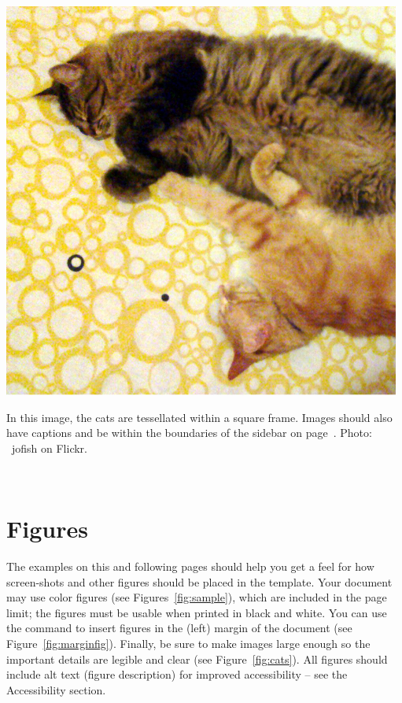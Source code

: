 \documentclass{sigchi-ext}
\begin{document}

\begin{marginfigure}[-35pc]
  \begin{minipage}{\marginparwidth}
    \centering
    \includegraphics[width=0.9\marginparwidth]{figures/cats}
    \caption{In this image, the cats are tessellated within a square
      frame. Images should also have captions and be within the
      boundaries of the sidebar on page~\pageref{sec:sidebar}. Photo:
      \cczero~jofish on Flickr.}~\label{fig:marginfig}
  \end{minipage}
\end{marginfigure}

\section{Figures}
The examples on this and following pages should help you get a feel
for how screen-shots and other figures should be placed in the
template. Your document may use color figures (see
Figures~\ref{fig:sample}), which are included in the page limit; the
figures must be usable when printed in black and white. You can use
the \texttt{\marginpar} command to insert figures in the (left) margin
of the document (see Figure~\ref{fig:marginfig}). Finally, be sure to
make images large enough so the important details are legible and
clear (see Figure~\ref{fig:cats}).
All figures should include alt text (figure description) for improved accessibility – see the Accessibility section.
\end{document}
